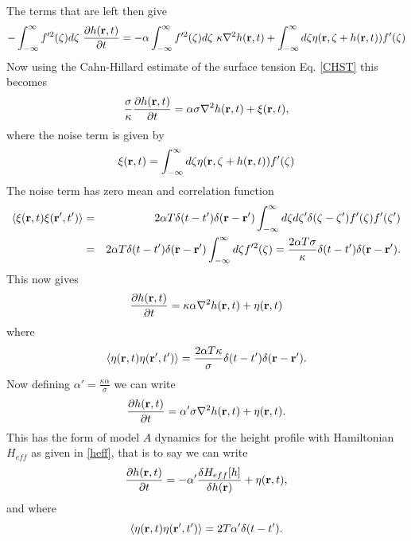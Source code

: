 \documentclass[11pt]{report}
\begin{document}
The terms that are left then give
\begin{equation}
-\int_{-\infty}^\infty f'^2(\zeta)d\zeta\ \frac{\partial h({\bf r},t)}{\partial t}
= -\alpha\int_{-\infty}^\infty f'^2(\zeta)d\zeta \ \kappa \nabla^2 h({\bf r},t) + \int_{-\infty}^\infty d\zeta \eta({\bf r},\zeta+ h({\bf r},t))f'(\zeta)
\end{equation}
Now using the Cahn-Hillard estimate of the surface tension Eq. \eqref{CHST} this becomes
\begin{equation}
\frac{\sigma}{\kappa} \frac{\partial h({\bf r},t)}{\partial t}
= \alpha\sigma \nabla^2 h({\bf r},t) +\xi({\bf r},t),
\end{equation}
where the noise term is given by
\begin{equation}
\xi({\bf r},t)= \int_{-\infty}^\infty d\zeta \eta({\bf r},\zeta+ h({\bf r},t))f'(\zeta)
\end{equation}
The noise term has zero mean and correlation function
\begin{eqnarray}
\langle \xi({\bf r},t)\xi({\bf r}',t')\rangle &=&2\alpha T\delta(t-t')\delta({\bf r}-{\bf r}')\int_{-\infty}^\infty d\zeta d\zeta' \delta(\zeta-\zeta')f'(\zeta)f'(\zeta')\\
&=& 2\alpha T\delta(t-t')\delta({\bf r}-{\bf r}')\int_{-\infty}^\infty d\zeta f'^2(\zeta)= \frac{2\alpha T\sigma}{\kappa}\delta(t-t')\delta({\bf r}-{\bf r}').
\end{eqnarray}
This now gives
\begin{equation}
\frac{\partial h({\bf r},t)}{\partial t}= \kappa\alpha \nabla^2 h({\bf r},t) + \eta({\bf r},t)
\end{equation}
where 
\begin{equation}
\langle \eta({\bf r},t)\eta({\bf r}',t')\rangle = \frac{2\alpha T\kappa}{\sigma}\delta(t-t')\delta({\bf r}-{\bf r}').
\end{equation}
Now defining $\alpha' = \frac{\kappa\alpha}{\sigma}$ we can write
\begin{equation}
\frac{\partial h({\bf r},t)}{\partial t}= \alpha' \sigma\nabla^2 h({\bf r},t) + \eta({\bf r},t).
\end{equation}
This has the form of model $A$ dynamics for the height profile with Hamiltonian
$H_{eff}$ as given in \eqref{heff}, that is to say we can write
\begin{equation}
\frac{\partial h({\bf r},t)}{\partial t}= -\alpha' \frac{\delta H_{eff}[h]}{\delta h({\bf r})} + \eta({\bf r},t),
\label{ew}
\end{equation}
and where 
\begin{equation}
\langle \eta({\bf r},t)\eta({\bf r}',t')\rangle= 2T\alpha'\delta(t-t').
\end{equation}
\end{document}
